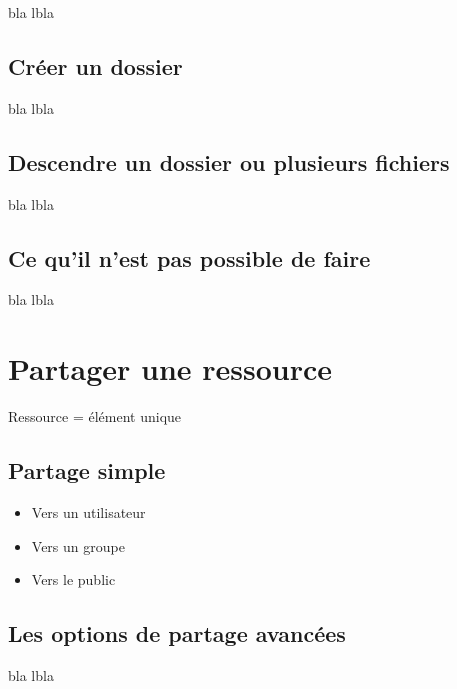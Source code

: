 bla lbla

\subsection*{Créer un dossier}

bla lbla

\subsection*{Descendre un dossier ou plusieurs fichiers}

bla lbla

\subsection*{Ce qu'il n'est pas possible de faire}

bla lbla

\section*{Partager une ressource}

Ressource = élément unique

\subsection*{Partage simple}

\begin{itemize}
    \item Vers un utilisateur
    \item Vers un groupe
    \item Vers le public 
\end{itemize}

\subsection*{Les options de partage avancées}

bla lbla